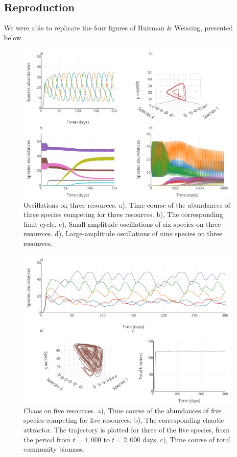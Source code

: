 \subsection{Reproduction}
We were able to replicate the four figures of Huisman \& Weissing\supercite{1999:Huisman}, presented below. 
\begin{figure}[H]
\begin{center} 
 \includegraphics[width=1\textwidth]{../Code/Figures/Figure_1.pdf}
  \caption{Oscillations on three resources. a), Time course of the abundances 
of three species competing for three resources. b), The corresponding limit 
cycle. c), Small-amplitude oscillations of six species on three resources. 
d), Large-amplitude oscillations of nine species on three resources.}
  \label{figures:Fig1}
\end{center}
\end{figure}
\begin{figure}[H]
\begin{center} 
 \includegraphics[width=1\textwidth]{../Code/Figures/Figure_2.pdf}
  \caption{Chaos on five resources. a), Time course of the abundances of five 
species competing for five resources. b), The corresponding chaotic attractor. 
The trajectory is plotted for three of the five species, from the period from 
$t= 1,000$ to $t=2,000$ days. c), Time course of total community biomass.}
  \label{figures:Fig2}
\end{center}
\end{figure}
